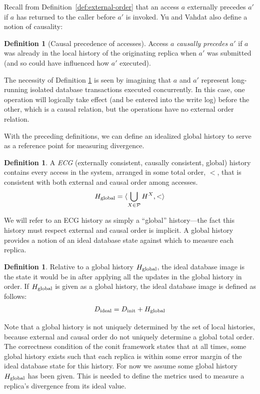 \documentclass[]             %
{NASA}                       %
\theoremstyle{definition}
\newtheorem{definition}[theorem]{Definition}
\begin{document}
Recall from Definition~\ref{def:external-order} that an access $a$
externally precedes $a'$ if $a$ has returned to the caller before $a'$
is invoked. Yu and Vahdat also define a notion of causality:
\begin{definition}[Causal precedence of accesses]
  \label{def:conit-causal-precedence}
  Access $a$ \emph{causally precedes} $a'$ if $a$ was already in the local
  history of the originating replica when $a'$ was submitted (and so
  could have influenced how $a'$ executed).
\end{definition}

The necessity of Definition \ref{def:conit-causal-precedence} is seen
by imagining that $a$ and $a'$ represent long-running isolated
database transactions executed concurrently. In this case, one
operation will logically take effect (and be entered into the write
log) before the other, which is a causal relation, but the operations
have no external order relation.

With the preceding definitions, we can define an idealized global
history to serve as a reference point for measuring divergence.
\begin{definition}
  A \emph{ECG} (externally consistent, causally consistent, global)
  history contains every access in the system, arranged in some total
  order, $<$, that is consistent with both external and causal order
  among accesses.
  \begin{equation}
    H_\mathrm{global} = \langle \bigcup_{X \in \mathcal{P}} H^{X}, < \rangle
  \end{equation}
\end{definition}
We will refer to an ECG history as simply a ``global'' history---the
fact this history must respect external and causal order is
implicit. A global history provides a notion of an ideal database
state against which to measure each replica.
\begin{definition}
  Relative to a global history $H_\mathrm{global}$, the ideal database image is
  the state it would be in after applying all the updates in the
  global history in order.  If $H_\mathrm{global}$ is given as a global
  history, the ideal database image is defined as follows:
  \begin{gather}
    D_{\textrm{ideal}} = D_\textrm{init} + H_\mathrm{global} \label{eq:conit-D-ideal}
  \end{gather}
\end{definition}
Note that a global history is not uniquely determined by the set of
local histories, because external and causal order do not uniquely
determine a global total order. The correctness condition of the conit
framework states that at all times, some global history exists such
that each replica is within some error margin of the ideal database
state for this history. For now we assume some global history
$H_\mathrm{global}$ has been given. This is needed to define the metrics used
to measure a replica's divergence from its ideal value.
\end{document}

